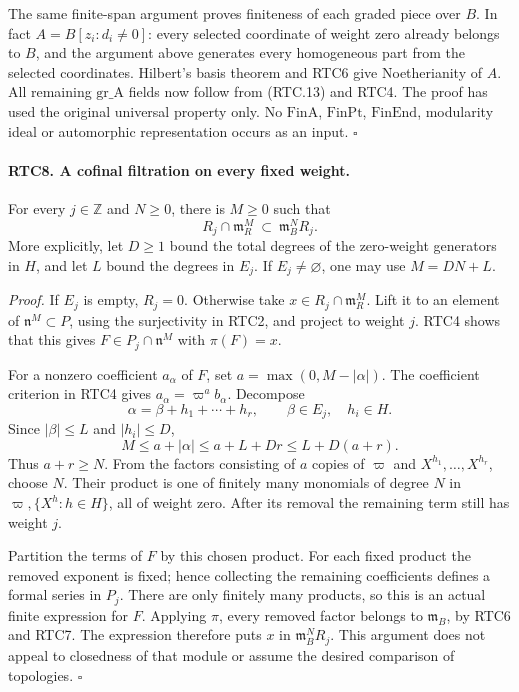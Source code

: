 \documentclass[11pt,a4paper]{article}
\numberwithin{equation}{section}
\theoremstyle{remark}\newtheorem{remark}[theorem]{Remark}
\begin{document}
The same finite-span argument proves finiteness of each graded
piece over \(B\).  In fact
\(A=B[z_i:d_i\ne0]\): every selected coordinate of weight zero
already belongs to \(B\), and the argument above generates every
homogeneous part from the selected coordinates.  Hilbert's basis
theorem and RTC6 give Noetherianity of \(A\).  All remaining
\(\mathrm{gr\_\allowbreak A}\) fields now follow from (RTC.13) and RTC4.
The proof has used the original universal property only.  No
\(\mathrm{FinA}\), \(\mathrm{FinPt}\), \(\mathrm{FinEnd}\),
modularity ideal or automorphic representation occurs as an input.
\hfill\(\square\)

\paragraph{RTC8. A cofinal filtration on every fixed weight.}
\label{claim:RTC8}
For every \(j\in\mathbb Z\) and \(N\geq0\), there is
\(M\geq0\) such that
\[
 R_j\cap\mathfrak m_R^M\ \subset\ \mathfrak m_B^N R_j.
                                                        \tag{RTC.14}
\]
More explicitly, let \(D\geq1\) bound the total degrees of
the zero-weight generators in \(H\), and let \(L\) bound the
degrees in \(E_j\).  If \(E_j\ne\varnothing\), one may use
\(M=DN+L\).

\emph{Proof.}
If \(E_j\) is empty, \(R_j=0\).  Otherwise take
\(x\in R_j\cap\mathfrak m_R^M\).  Lift it to an element of
\(\mathfrak n^M\subset P\), using the surjectivity in RTC2,
and project to weight \(j\).  RTC4 shows that this gives
\(F\in P_j\cap\mathfrak n^M\) with \(\pi(F)=x\).

For a nonzero coefficient \(a_\alpha\) of \(F\), set
\(a=\max(0,M-|\alpha|)\).  The coefficient criterion in
RTC4 gives \(a_\alpha=\varpi^a b_\alpha\).  Decompose
\[
 \alpha=\beta+h_1+\cdots+h_r,
       \qquad\beta\in E_j,\quad h_i\in H.
\]
Since \(|\beta|\leq L\) and \(|h_i|\leq D\),
\[
 M\leq a+|\alpha|\leq a+L+Dr\leq L+D(a+r).
\]
Thus \(a+r\geq N\).  From the factors consisting of \(a\)
copies of \(\varpi\) and \(X^{h_1},\ldots,X^{h_r}\),
choose \(N\).  Their product is one of finitely many monomials
of degree \(N\) in
\(\varpi,\{X^h:h\in H\}\), all of weight zero.  After its
removal the remaining term still has weight \(j\).

Partition the terms of \(F\) by this chosen product.  For each
fixed product the removed exponent is fixed; hence collecting the
remaining coefficients defines a formal series in \(P_j\).
There are only finitely many products, so this is an actual finite
expression for \(F\).  Applying \(\pi\), every removed factor
belongs to \(\mathfrak m_B\), by RTC6 and RTC7.  The expression
therefore puts \(x\) in \(\mathfrak m_B^N R_j\).
This argument does not appeal to closedness of that module or
assume the desired comparison of topologies. \hfill\(\square\)
\end{document}
